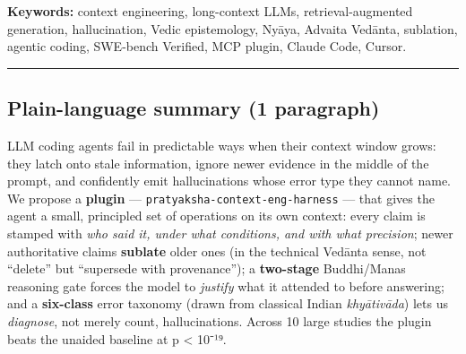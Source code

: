 \textbf{Keywords:} context engineering, long-context LLMs, retrieval-augmented generation, hallucination, Vedic epistemology, Nyāya, Advaita Vedānta, sublation, agentic coding, SWE-bench Verified, MCP plugin, Claude Code, Cursor.

\begin{center}\rule{0.5\linewidth}{0.5pt}\end{center}

\subsection{Plain-language summary (1 paragraph)}\label{plain-language-summary-1-paragraph}

LLM coding agents fail in predictable ways when their context window grows: they latch onto stale information, ignore newer evidence in the middle of the prompt, and confidently emit hallucinations whose error type they cannot name. We propose a \textbf{plugin} --- \texttt{pratyaksha-context-eng-harness} --- that gives the agent a small, principled set of operations on its own context: every claim is stamped with \emph{who said it, under what conditions, and with what precision}; newer authoritative claims \textbf{sublate} older ones (in the technical Vedānta sense, not ``delete'' but ``supersede with provenance''); a \textbf{two-stage} Buddhi/Manas reasoning gate forces the model to \emph{justify} what it attended to before answering; and a \textbf{six-class} error taxonomy (drawn from classical Indian \emph{khyātivāda}) lets us \emph{diagnose}, not merely count, hallucinations. Across 10 large studies the plugin beats the unaided baseline at p \textless{} 10⁻¹⁹.
